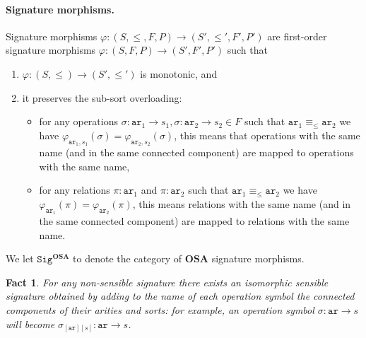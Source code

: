 \documentclass{article}
\newtheorem{fact}[definition]{Fact}
\newcommand{\OSA}{{\mathbf{OSA}}}
\newcommand{\Sig}{\mathtt{Sig}}
\newcommand{\ari}{\mathtt{ar}}
\begin{document}
\paragraph{Signature morphisms.}
Signature morphisms $\varphi:(S,\leq,F,P)\to (S',\leq',F',P')$ are first-order signature morphisms $\varphi:(S,F,P)\to(S',F',P')$ such that 
\begin{enumerate}[label=\alph*),nosep,leftmargin=1.5em]

\item $\varphi:(S,\leq)\to(S',\leq')$ is monotonic, and

\item it preserves the sub-sort overloading: 
\begin{itemize}[nosep,leftmargin=1em]
\item for any operations $\sigma:\ari_1\to s_1, \sigma:\ari_2\to s_2\in F$ such that $\ari_1\equiv_\leq \ari_2$ we have  $\varphi_{\ari_1,s_1}(\sigma)=\varphi_{\ari_2,s_2}(\sigma)$, 
this means that operations with the same name (and in the same connected component) are mapped to operations with the same name, 

\item for any relations $\pi:\ari_1$ and $\pi:\ari_2$ such that $\ari_1\equiv_\leq \ari_2$ we have $\varphi_{\ari_1}(\pi)=\varphi_{\ari_2}(\pi)$, 
this means relations with the same name (and in the same connected component) are mapped to relations with the same name.
\end{itemize}
\end{enumerate}
We let $\Sig^\OSA$ to denote the category of $\OSA$ signature morphisms.

\begin{fact}
	For any non-sensible signature there exists an isomorphic sensible signature obtained by adding to the name of each operation symbol the connected components of their arities and sorts: 
	for example, an operation symbol $\sigma:\ari\to s$ will become $\sigma_{[\ari][s]}:\ari\to s$.
\end{fact}
\end{document}
